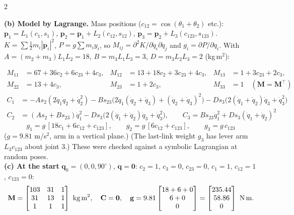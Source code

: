 \begin{multicols}{2}
\begin{examq}
\end{examq}
\begin{examq}
\textbf{(b) Model by Lagrange.} Mass positions ($c_{12}=\cos(\theta_1+\theta_2)$ etc.): $\mathbf p_1=L_1(c_1,s_1)$, $\mathbf p_2=\mathbf p_1+L_2(c_{12},s_{12})$, $\mathbf p_3=\mathbf p_2+L_3(c_{123},s_{123})$. $K=\sum\tfrac12m_i|\dot{\mathbf p}_i|^2$, $P=g\sum m_iy_i$, so $M_{ij}=\partial^2K/\partial\dot q_i\partial\dot q_j$ and $g_i=\partial P/\partial q_i$. With $A=(m_2{+}m_3)L_1L_2=18$, $B=m_3L_1L_3=3$, $D=m_3L_2L_3=2$ (kg\,m$^2$):
\end{examq}
\begin{examq}
\[\begin{aligned}
M_{11}&=67+36c_2+6c_{23}+4c_3, & M_{12}&=13+18c_2+3c_{23}+4c_3, & M_{13}&=1+3c_{23}+2c_3,\\
M_{22}&=13+4c_3, & M_{23}&=1+2c_3, & M_{33}&=1\quad(\mathbf M=\mathbf M^\top)
\end{aligned}\]
\[\begin{aligned}
C_1&=-As_2(2\dot q_1\dot q_2+\dot q_2^2)-Bs_{23}\big(2\dot q_1(\dot q_2{+}\dot q_3)+(\dot q_2{+}\dot q_3)^2\big)-Ds_3\big(2(\dot q_1{+}\dot q_2)\dot q_3+\dot q_3^2\big)\\
C_2&=(As_2+Bs_{23})\dot q_1^2-Ds_3\big(2(\dot q_1{+}\dot q_2)\dot q_3+\dot q_3^2\big),\qquad C_3=Bs_{23}\dot q_1^2+Ds_3(\dot q_1+\dot q_2)^2
\end{aligned}\]
\[g_1=g\,[18c_1+6c_{12}+c_{123}],\qquad g_2=g\,[6c_{12}+c_{123}],\qquad g_3=g\,c_{123}\]
($g=9.81$ m/s$^2$, arm in a vertical plane.)
(The last-link weight $g_3$ has lever arm $L_3c_{123}$ about joint 3.) These were checked against a symbolic Lagrangian at random poses. \chk\\
\textbf{(c) At the start} $\mathbf q_0=(0,0,90^\circ)$, $\dot{\mathbf q}=\mathbf 0$: $c_2=1$, $c_3=0$, $c_{23}=0$, $c_1=1$, $c_{12}=1$, $c_{123}=0$:
\[\mathbf M=\begin{bmatrix}103&31&1\\31&13&1\\1&1&1\end{bmatrix}\ \text{kg\,m}^2,\quad\mathbf C=\mathbf 0,\quad\mathbf g=9.81\begin{bmatrix}18+6+0\\6+0\\0\end{bmatrix}=\begin{bmatrix}235.44\\58.86\\0\end{bmatrix}\ \text{N\,m}.\]

\end{examq}
\end{multicols}
